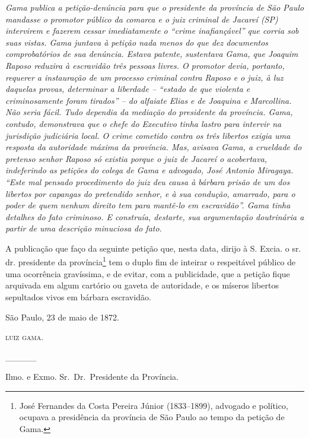 {\begin{didascalia}
\emph{Gama publica a petição-denúncia para que o presidente da província
de São Paulo mandasse o promotor público da comarca e o juiz criminal de
Jacareí (SP) intervirem e fazerem cessar imediatamente o ``crime
inafiançável'' que corria sob suas vistas. Gama juntava à petição nada
menos do que dez documentos comprobatórios de sua denúncia. Estava
patente, sustentava Gama, que Joaquim Raposo reduzira à escravidão três
pessoas livres. O promotor devia, portanto, requerer a instauração de um
processo criminal contra Raposo e o juiz, à luz daquelas provas,
determinar a liberdade -- ``estado de que violenta e criminosamente foram
tirados'' -- do alfaiate Elias e de Joaquina e Marcollina. Não seria
fácil. Tudo dependia da mediação do presidente da província. Gama,
contudo, demonstrava que o chefe do Executivo tinha lastro para intervir
na jurisdição judiciária local. O crime cometido contra os três libertos
exigia uma resposta da autoridade máxima da província. Mas, avisava
Gama, a crueldade do pretenso senhor Raposo só existia porque o juiz de
Jacareí o acobertava, indeferindo as petições do colega de Gama e
advogado, José Antonio Miragaya. ``Este mal pensado procedimento do juiz
deu causa à bárbara prisão de um dos libertos por capangas do pretendido
senhor, e à sua condução, amarrado, para o poder de quem nenhum direito
tem para mantê-lo em escravidão''. Gama tinha detalhes do fato criminoso.
E construía, destarte, sua argumentação doutrinária a partir de uma
descrição minuciosa do fato.}
\end{didascalia}

\asterisc{}

A publicação que faço da seguinte petição que, nesta data, dirijo à S.
Excia. o sr. dr. presidente da província\footnote{ José Fernandes da
  Costa Pereira Júnior (1833--1899), advogado e político, ocupava a
  presidência da província de São Paulo ao tempo da petição de Gama.}
tem o duplo fim de inteirar o respeitável público de uma ocorrência
gravíssima, e de evitar, com a publicidade, que a petição fique
arquivada em algum cartório ou gaveta de autoridade, e os míseros
libertos sepultados vivos em bárbara escravidão.

São Paulo, 23 de maio de 1872.

\textsc{luiz gama}.

\_\_\_\_\_

Ilmo. e Exmo. Sr.~Dr.~Presidente da Província.

}
